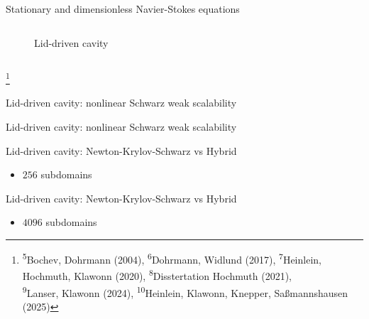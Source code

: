 \begin{frame}{Stationary and dimensionless Navier-Stokes equations}
\begin{columns}
\begin{column}{0.4\textwidth}
\begin{figure}
				\caption{Lid-driven cavity}
			\end{figure}
		\end{column}
	\end{columns}
    {\let\thefootnote\relax\footnote{{\tiny \textsuperscript{5}Bochev, Dohrmann (2004),  \textsuperscript{6}Dohrmann, Widlund (2017), \textsuperscript{7}Heinlein, Hochmuth, Klawonn (2020),  \textsuperscript{8}Disstertation Hochmuth (2021),\\\hspace{3em}\textsuperscript{9}Lanser, Klawonn (2024),  \textsuperscript{10}Heinlein, Klawonn, Knepper, Saßmannshausen (2025)}}}
\end{frame}

\begin{frame}{Lid-driven cavity: nonlinear Schwarz weak scalability}
	\begin{figure}
		\centering
		
		\label{fig:weak-scalability-nls}
	\end{figure}
\end{frame}

\begin{frame}{Lid-driven cavity: nonlinear Schwarz weak scalability}
	\begin{figure}
		\centering
		
		\label{fig:weak-scalability-per-iter-nls}
	\end{figure}
\end{frame}

\begin{frame}{Lid-driven cavity: Newton-Krylov-Schwarz vs Hybrid}
	\begin{itemize}
		\item $256$ subdomains
	\end{itemize}
	\begin{figure}
		\centering
		
		\label{fig:residual-ldc-256}
	\end{figure}
\end{frame}

\begin{frame}{Lid-driven cavity: Newton-Krylov-Schwarz vs Hybrid}
	\begin{itemize}
		\item $4096$ subdomains
	\end{itemize}
	\begin{figure}
		\centering
		
		\label{fig:residual-ldc-4096}
	\end{figure}
\end{frame}

